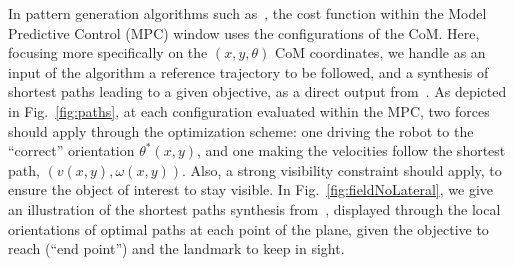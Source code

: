 In pattern generation algorithms such as~\cite{HerdtAR2010}, the cost function within the Model Predictive Control (MPC) window uses the configurations of the CoM. Here, focusing more specifically on the $(x,y,\theta)$ CoM coordinates, we handle as an input of the algorithm a reference trajectory to be followed, and a synthesis of shortest paths leading to a given objective, as a direct output from~\cite{Salaris:2010}. As depicted in Fig.~\ref{fig:paths}, at each configuration evaluated within the MPC, two forces should apply through the optimization scheme: one driving the robot to the ``correct'' orientation $\theta^*(x,y)$, and one making the velocities follow the shortest path, $(v(x,y),\omega(x,y))$. Also, a strong visibility constraint should apply, to ensure the object of interest to stay visible. In Fig.~\ref{fig:fieldNoLateral}, we give an illustration of the shortest paths synthesis from~\cite{Salaris:2010}, displayed through the local orientations of optimal paths at each point of the plane, given the objective to reach (``end point'') and the landmark to keep in sight. 






